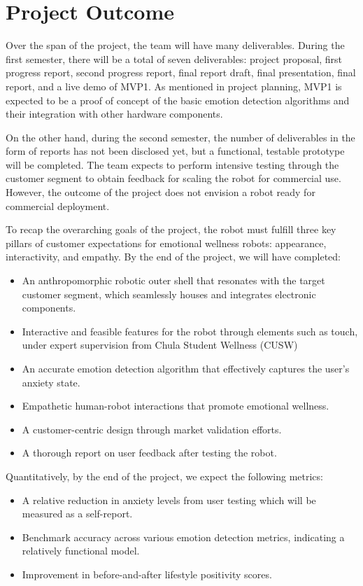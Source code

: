 \section{Project Outcome}

Over the span of the project, the team will have many deliverables. During the first semester, there will be a total of seven deliverables: project proposal, first progress report, second progress report, final report draft, final presentation, final report, and a live demo of MVP1. As mentioned in project planning, MVP1 is expected to be a proof of concept of the basic emotion detection algorithms and their integration with other hardware components.

On the other hand, during the second semester, the number of deliverables in the form of reports has not been disclosed yet, but a functional, testable prototype will be completed. The team expects to perform intensive testing through the customer segment to obtain feedback for scaling the robot for commercial use. However, the outcome of the project does not envision a robot ready for commercial deployment.

To recap the overarching goals of the project, the robot must fulfill three key pillars of customer expectations for emotional wellness robots: appearance, interactivity, and empathy. By the end of the project, we will have completed:

\begin{itemize}
    \item An anthropomorphic robotic outer shell that resonates with the target customer segment, which seamlessly houses and integrates electronic components.
    \item Interactive and feasible features for the robot through elements such as touch, under expert supervision from Chula Student Wellness (CUSW) 
    \item An accurate emotion detection algorithm that effectively captures the user’s anxiety state.
    \item Empathetic human-robot interactions that promote emotional wellness.
    \item A customer-centric design through market validation efforts.
    \item A thorough report on user feedback after testing the robot.
\end{itemize}

Quantitatively, by the end of the project, we expect the following metrics:

\begin{itemize}
    \item A relative reduction in anxiety levels from user testing which will be measured as a self-report.
    \item Benchmark accuracy across various emotion detection metrics, indicating a relatively functional model.
    \item Improvement in before-and-after lifestyle positivity scores.
\end{itemize}

